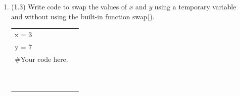 \documentclass{article}
\begin{document}
\begin{enumerate}
\item (1.3) 
		Write code to swap the values of $x$ and $y$ using a temporary variable and without using
		the built-in function swap().\\		
		\begin{tabular}{|ll}
			\\			
			x = 3\\
			y = 7\\[5pt]
			\#Your code here. \\[5pt]
			& \\ & \\ & \\ & \\ & \\ & \\ & \\ & \\ & \\ & \\ 
		\end{tabular}



\end{enumerate}
\pagebreak
\end{document}
